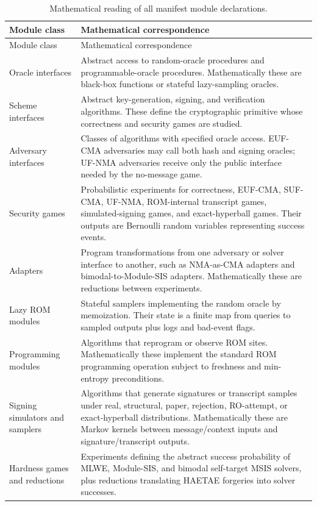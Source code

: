 \begin{longtable}{p{}p{}}
\caption{Mathematical reading of all manifest module declarations.}
\label{tab:module-correspondence}\\
\toprule
Module class & Mathematical correspondence \\
\midrule
\endfirsthead
\toprule
Module class & Mathematical correspondence \\
\midrule
\endhead
Oracle interfaces &
Abstract access to random-oracle procedures and programmable-oracle procedures.
Mathematically these are black-box functions or stateful lazy-sampling oracles. \\
Scheme interfaces &
Abstract key-generation, signing, and verification algorithms.  These define the
cryptographic primitive whose correctness and security games are studied. \\
Adversary interfaces &
Classes of algorithms with specified oracle access.  EUF-CMA adversaries may
call both hash and signing oracles; UF-NMA adversaries receive only the public
interface needed by the no-message game. \\
Security games &
Probabilistic experiments for correctness, EUF-CMA, SUF-CMA, UF-NMA,
ROM-internal transcript games, simulated-signing games, and exact-hyperball
games.  Their outputs are Bernoulli random variables representing success
events. \\
Adapters &
Program transformations from one adversary or solver interface to another, such
as NMA-as-CMA adapters and bimodal-to-Module-SIS adapters.  Mathematically these
are reductions between experiments. \\
Lazy ROM modules &
Stateful samplers implementing the random oracle by memoization.  Their state is
a finite map from queries to sampled outputs plus logs and bad-event flags. \\
Programming modules &
Algorithms that reprogram or observe ROM sites.  Mathematically these implement
the standard ROM programming operation subject to freshness and min-entropy
preconditions. \\
Signing simulators and samplers &
Algorithms that generate signatures or transcript samples under real,
structural, paper, rejection, RO-attempt, or exact-hyperball distributions.
Mathematically these are Markov kernels between message/context inputs and
signature/transcript outputs. \\
Hardness games and reductions &
Experiments defining the abstract success probability of MLWE, Module-SIS, and
bimodal self-target MSIS solvers, plus reductions translating HAETAE forgeries
into solver successes. \\
\bottomrule
\end{longtable}

